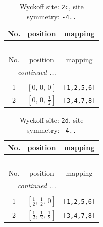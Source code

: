 \documentclass[fleqn,8pt]{jsarticle}
\begin{document}
\renewcommand{\arraystretch}{1.2}
\begin{longtable}{ccc}
\caption{Wyckoff site: {\tt 2c}, site symmetry: {\tt -4..}}
 \\
 \hline \hline
No. & position & mapping \\ \hline \endfirsthead

\multicolumn{2}{l}{\tablename\ \thetable{}} \\
 \hline \hline
No. & position & mapping \\ \hline \endhead

 \hline \hline
\multicolumn{2}{r}{\footnotesize\it continued ...} \\ \endfoot

 \hline \hline
\multicolumn{2}{r}{} \\ \endlastfoot

1 & $\left[ 0,\, 0,\, 0 \right]$ & {\tt [1,2,5,6]} \\ \hline
2 & $\left[ 0,\, 0,\, \frac{1}{2} \right]$ & {\tt [3,4,7,8]} \\
\end{longtable}
\renewcommand{\arraystretch}{1.2}
\begin{longtable}{ccc}
\caption{Wyckoff site: {\tt 2d}, site symmetry: {\tt -4..}}
 \\
 \hline \hline
No. & position & mapping \\ \hline \endfirsthead

\multicolumn{2}{l}{\tablename\ \thetable{}} \\
 \hline \hline
No. & position & mapping \\ \hline \endhead

 \hline \hline
\multicolumn{2}{r}{\footnotesize\it continued ...} \\ \endfoot

 \hline \hline
\multicolumn{2}{r}{} \\ \endlastfoot

1 & $\left[ \frac{1}{2},\, \frac{1}{2},\, 0 \right]$ & {\tt [1,2,5,6]} \\ \hline
2 & $\left[ \frac{1}{2},\, \frac{1}{2},\, \frac{1}{2} \right]$ & {\tt [3,4,7,8]} \\
\end{longtable}
\renewcommand{\arraystretch}{1.2}
\end{document}
